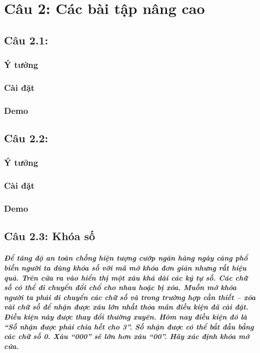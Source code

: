 \chapter{Câu 2: Các bài tập nâng cao}

\section{Câu 2.1:}
\subsection{Ý tưởng}
\subsection{Cài đặt}
\subsection{Demo}

\section{Câu 2.2:}
\subsection{Ý tưởng}
\subsection{Cài đặt}
\subsection{Demo}

\section{Câu 2.3: Khóa số}

\paragraph{Để tăng độ an toàn chống hiện tượng cướp ngân hàng ngày càng phổ biến
người ta dùng khóa số với mã mở khóa đơn giản nhưng rất hiệu quả. Trên cửa
ra vào hiển thị một xâu khá dài các ký tự số. Các chữ số có thể di chuyển đổi
chổ cho nhau hoặc bị xóa. Muốn mở khóa người ta phải di chuyển các chữ số
và trong trường hợp cần thiết – xóa vài chữ số để nhận được xâu lớn nhất thỏa
mãn điều kiện đã cài đặt. Điều kiện này được thay đổi thường xuyên. Hôm nay
điều kiện đó là \textit{``Số nhận được phải chia hết cho 3''}. Số nhận được có thể bắt
đầu bằng các chữ số 0. Xâu ``000'' sẽ lớn hơn xâu ``00''.
Hãy xác định khóa mở cửa.}

